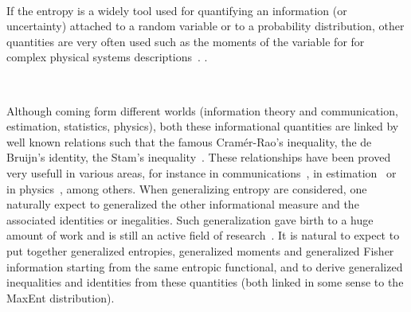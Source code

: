\documentclass[english,sort&compress]{elsarticle}
\theoremstyle{definition}
\theoremstyle{plain}
\theoremstyle{plain}
\begin{document}
\

If  the  entropy is  a  widely  tool used  for  quantifying  an information  (or
uncertainty) attached  to a  random variable or  to a  probability distribution,
other  quantities are  very  often used  such  as the  moments  of the  variable
 for  for  complex  physical
systems   descriptions~\cite{Fri04,  VigBer03,  RomAng99,   RomSan06,  SanGon06,
  TorLop15}.  .

\

Although  coming form  different worlds  (information theory  and communication,
estimation, statistics, physics), both these informational quantities are linked
by well known  relations such that the famous  Cram\'er-Rao's inequality, the de
Bruijn's  identity,  the   Stam's  inequality~\cite{CovTho06,  Sta59,  DemCov91,
  GuoSha05}.   These relationships  have  been proved  very  usefull in  various
areas,  for  instance  in  communications~\cite{Sta59, DemCov91,  CovTho06},  in
estimation~\cite{Kay93} or in physics~\cite{FolSit97, Sen11}, among others. When
generalizing  entropy are considered,  one naturally  expect to  generalized the
other informational measure and  the associated identities or inegalities.  Such
generalization gave birth to a huge amount  of work and is still an active field
of research~\cite{Vaj73,  Boe77, Ham78, BoeVan80,  BurRao82, LutYan04, LutYan05,
  LutYan07, LutLv12, Ber12:06_1, Ber12:06_2, Ber13, Ber13:08}.  It is natural to
expect  to   put  together   generalized  entropies,  generalized   moments  and
generalized Fisher  information starting from the same  entropic functional, and
to derive  generalized inequalities and  identities from these  quantities (both
linked in some sense to the MaxEnt distribution).

\
\end{document}
